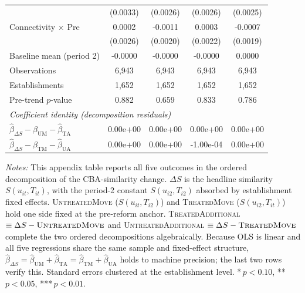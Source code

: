 \begin{table}[H]
\begin{tabular}{lcccc}
\quad & (0.0033) & (0.0026) & (0.0026) & (0.0025) \\
\quad Connectivity $\times$ Pre  & 0.0002 & -0.0011 & 0.0003 & -0.0007 \\
\quad & (0.0026) & (0.0020) & (0.0022) & (0.0019) \\
\hline
Baseline mean (period 2) & -0.0000 & -0.0000 & -0.0000 & 0.0000 \\
Observations           & 6,943 & 6,943 & 6,943 & 6,943 \\
Establishments         & 1,652 & 1,652 & 1,652 & 1,652 \\
Pre-trend $p$-value    & 0.882 & 0.659 & 0.833 & 0.786 \\
\hline
\multicolumn{5}{l}{\textit{Coefficient identity (decomposition residuals)}} \\
\quad $\hat\beta_{\Delta S} - \hat\beta_{\text{UM}} - \hat\beta_{\text{TA}}$ & 0.00e+00 & 0.00e+00 & 0.00e+00 & 0.00e+00 \\
\quad $\hat\beta_{\Delta S} - \hat\beta_{\text{TM}} - \hat\beta_{\text{UA}}$ & 0.00e+00 & 0.00e+00 & -1.00e-04 & 0.00e+00 \\
\hline\hline
\end{tabular}
\begin{minipage}{\linewidth}
\smallskip
\scriptsize\textit{Notes:} This appendix table reports all five outcomes in the ordered decomposition of the CBA-similarity change. $\Delta S$ is the headline similarity $S(u_{it}, T_{it})$, with the period-2 constant $S(u_{i2}, T_{i2})$ absorbed by establishment fixed effects. \textsc{UntreatedMove} ($S(u_{it}, T_{i2})$) and \textsc{TreatedMove} ($S(u_{i2}, T_{it})$) hold one side fixed at the pre-reform anchor. \textsc{TreatedAdditional} $\equiv \Delta S - \textsc{UntreatedMove}$ and \textsc{UntreatedAdditional} $\equiv \Delta S - \textsc{TreatedMove}$ complete the two ordered decompositions algebraically. Because OLS is linear and all five regressions share the same sample and fixed-effect structure, $\hat\beta_{\Delta S} = \hat\beta_{\text{UM}} + \hat\beta_{\text{TA}} = \hat\beta_{\text{TM}} + \hat\beta_{\text{UA}}$ holds to machine precision; the last two rows verify this. Standard errors clustered at the establishment level. *\,$p<0.10$, **\,$p<0.05$, ***\,$p<0.01$.
\end{minipage}
\end{table}
